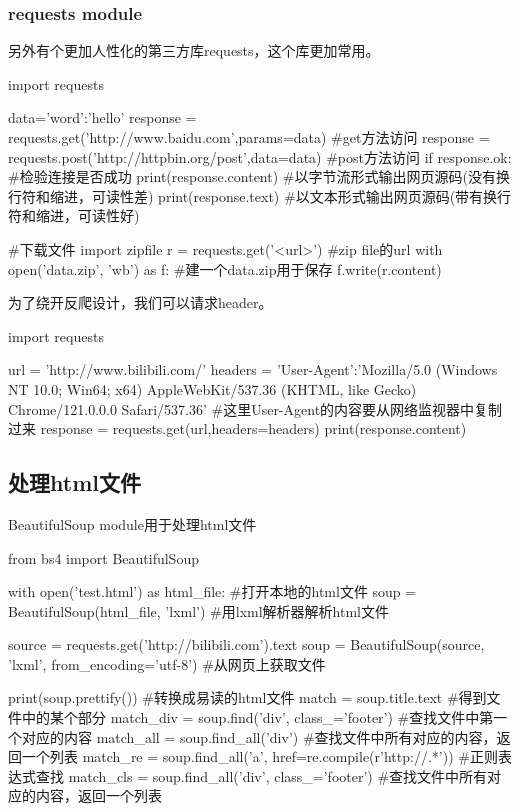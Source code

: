     \subsubsection{requests module}
      另外有个更加人性化的第三方库requests，这个库更加常用。
      \begin{codeblock}[language=python, caption={requests module}]
        import requests

        data={'word':'hello'}
        response = requests.get('http://www.baidu.com',params=data) #get方法访问
        response = requests.post('http://httpbin.org/post',data=data) #post方法访问
        if response.ok: #检验连接是否成功
            print(response.content) #以字节流形式输出网页源码(没有换行符和缩进，可读性差)
            print(response.text) #以文本形式输出网页源码(带有换行符和缩进，可读性好)

        #下载文件
        import zipfile
        r = requests.get('<url>') #zip file的url
        with open('data.zip', 'wb') as f: #建一个data.zip用于保存
            f.write(r.content)
      \end{codeblock}

      为了绕开反爬设计，我们可以请求header。
      \begin{codeblock}[language=python, caption={Handling request headers}]
        import requests

        url = 'http://www.bilibili.com/'
        headers = {'User-Agent':'Mozilla/5.0 (Windows NT 10.0; Win64; x64) 
            AppleWebKit/537.36 (KHTML, like Gecko) Chrome/121.0.0.0 Safari/537.36'}
        #这里User-Agent的内容要从网络监视器中复制过来
        response = requests.get(url,headers=headers)
        print(response.content)
      \end{codeblock}

  \subsection{处理html文件}
    BeautifulSoup module用于处理html文件
    \begin{codeblock}[language=python, caption={Handling HTML}]
      from bs4 import BeautifulSoup

      with open('test.html') as html_file: #打开本地的html文件
          soup = BeautifulSoup(html_file, 'lxml') #用lxml解析器解析html文件

      source = requests.get('http://bilibili.com').text
      soup = BeautifulSoup(source, 'lxml', from_encoding='utf-8') #从网页上获取文件

      print(soup.prettify()) #转换成易读的html文件
      match = soup.title.text #得到文件中的某个部分
      match_div = soup.find('div', class_='footer') #查找文件中第一个对应的内容
      match_all = soup.find_all('div') #查找文件中所有对应的内容，返回一个列表
      match_re = soup.find_all('a', href=re.compile(r'http://.*')) #正则表达式查找
      match_cls = soup.find_all('div', class_='footer') #查找文件中所有对应的内容，返回一个列表
    \end{codeblock}

